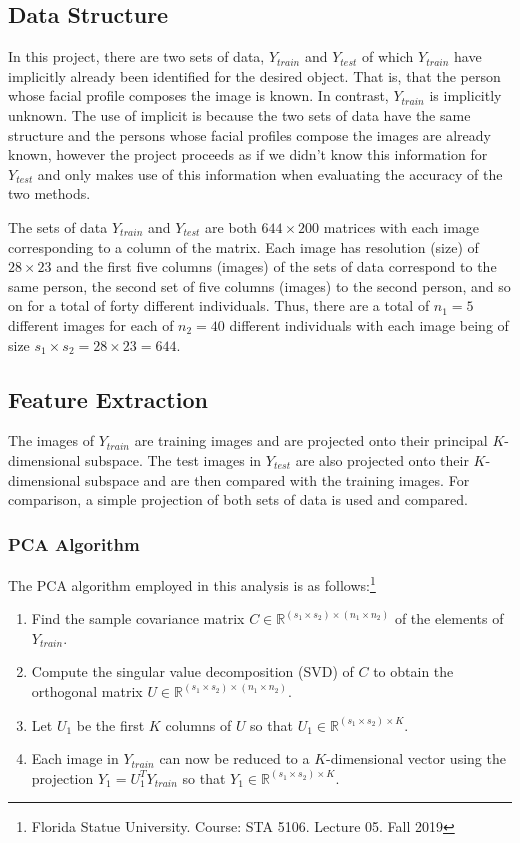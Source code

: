 \documentclass[12pt]{article}
\newcommand{\Real}{\mathbb{R}}
\begin{document}
   \subsection{Data Structure}
   In this project, there are two sets of data, $ Y_{train} $ and $ Y_{test} $ of which $ Y_{train} $ have implicitly already been identified for the desired object. That is, that the person whose facial profile composes the image is known. In contrast, $ Y_{train} $ is implicitly unknown. The use of implicit is because the two sets of data have the same structure and the persons whose facial profiles compose the images are already known, however the project proceeds as if we didn't know this information for $ Y_{test} $ and only makes use of this information when evaluating the accuracy of the two methods.
   
   The sets of data $ Y_{train} $ and $ Y_{test} $ are both $ 644 \times 200 $ matrices with each image corresponding to a column of the matrix. Each image has resolution (size) of $ 28 \times 23 $ and the first five columns (images) of the sets of data correspond to the same person, the second set of five columns (images) to the second person, and so on for a total of forty different individuals. Thus, there are a total of $ n_1 = 5 $ different images for each of $ n_2=40 $ different individuals with each image being of size $ s_1\times s_2 = 28\times 23 = 644$. 
   
   \subsection{Feature Extraction}
   The images of $ Y_{train} $ are training images and are projected onto their principal $ K $-dimensional subspace. The test images in $ Y_{test} $ are also projected onto their $ K $-dimensional subspace and are then compared with the training images. For comparison, a simple projection of both sets of data is used and compared. 
   
   \subsubsection{PCA Algorithm}
   The PCA algorithm employed in this analysis is as follows:\footnote{Florida Statue University. Course: STA 5106. Lecture 05. Fall 2019}
   \begin{enumerate}
   	\item Find the sample covariance matrix $ C\in \Real^{(s_1\times s_2)\times (n_1\times n_2)} $ of the elements of $ Y_{train} $. 
   	\item Compute the singular value decomposition (SVD) of $ C $ to obtain the orthogonal matrix $ U \in \Real^{(s_1\times s_2)\times (n_1\times n_2) } $.
   	\item Let $ U_{1} $ be the first $ K $ columns of $ U $ so that $ U_{1}\in\Real^{ (s_1\times s_2)\times K } $. 
   	\item Each image in $ Y_{train} $ can now be reduced to a $ K $-dimensional vector using the projection $ Y_{1} = U_{1}^T Y_{train} $ so that $ Y_{1} \in \Real^{ (s_1\times s_2)\times K } $.
   \end{enumerate}
\end{document}
